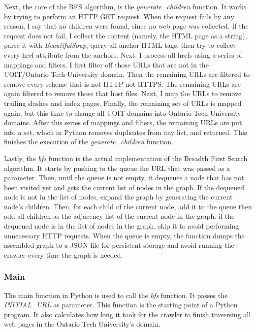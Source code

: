 Next, the core of the BFS algorithm, is the \textit{generate\_children} function. It works by trying to perform an HTTP GET request. When the request fails by any reason, I say that no children were found, since no web page was collected. If the request does not fail, I collect the content (namely, the HTML page as a string), parse it with \textit{BeautifulSoup}, query all anchor HTML tags, then try to collect every href attribute from the anchors. Next, I process all hrefs using a series of mappings and filters. I first filter off those URLs that are not in the UOIT/Ontario Tech University domain. Then the remaining URLs are filtered to remove every scheme that is not HTTP not HTTPS. The remaining URLs are again filtered to remove those that host files. Next, I map the URLs to remove trailing slashes and index pages. Finally, the remaining set of URLs is mapped again, but this time to change all UOIT domains into Ontario Tech University domains. After this series of mappings and filters, the remaining URLs are put into a set, which in Python removes duplicates from any list, and returned. This finishes the execution of the \textit{generate\_children} function.

Lastly, the \textit{bfs} function is the actual implementation of the Breadth First Search algorithm. It starts by pushing to the queue the URL that was passed as a parameter. Then, until the queue is not empty, it dequeues a node that has not been visited yet and gets the current list of nodes in the graph. If the dequeued node is not in the list of nodes, expand the graph by generating the current node's children. Then, for each child of the current node, add it to the queue then add all children as the adjacency list of the current node in the graph. if the dequeued node is in the list of nodes in the graph, skip it to avoid performing unnecessary HTTP requests. When the queue is empty, the function dumps the assembled graph to a JSON file for persistent storage and avoid running the crawler every time the graph is needed.

\subsubsection{Main}
The main function in Python is used to call the \textit{bfs} function. It passes the \textit{INITIAL\_URL} as parameter. This function is the starting point of a Python program. It also calculates how long it took for the crawler to finish traversing all web pages in the Ontario Tech University's domain.


